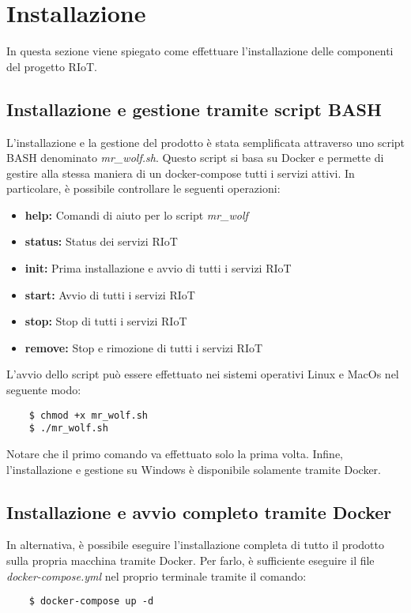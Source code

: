 \section{Installazione}
	In questa sezione viene spiegato come effettuare l'installazione delle componenti del progetto RIoT.

	\subsection{Installazione e gestione tramite script BASH}

	L'installazione e la gestione del prodotto è stata semplificata attraverso uno script BASH denominato \textit{mr\_wolf.sh}. Questo script si basa su Docker e permette di gestire alla stessa maniera di un docker-compose tutti i servizi attivi.
	In particolare, è possibile controllare le seguenti operazioni: 
	\begin{itemize}
		\item \textbf{help:}  	Comandi di aiuto per lo script \textit{mr\_wolf}
    	\item \textbf{status:}  Status dei servizi RIoT
    	\item \textbf{init:}  	Prima installazione e avvio di tutti i servizi RIoT
    	\item \textbf{start:} 	Avvio di tutti i servizi RIoT
    	\item \textbf{stop:}  	Stop di tutti i servizi RIoT
    	\item \textbf{remove:}	Stop e rimozione di tutti i servizi RIoT
	\end{itemize}

	L'avvio dello script può essere effettuato nei sistemi operativi Linux e MacOs nel seguente modo:
	\begin{verbatim}
	$ chmod +x mr_wolf.sh
	$ ./mr_wolf.sh
	\end{verbatim}
	Notare che il primo comando va effettuato solo la prima volta. Infine, l'installazione e gestione su Windows è disponibile solamente tramite Docker.

	\subsection{Installazione e avvio completo tramite Docker}
	
	In alternativa, è possibile eseguire l'installazione completa di tutto il prodotto sulla propria macchina tramite Docker. Per farlo, è sufficiente eseguire il file \textit{docker-compose.yml} nel proprio terminale tramite il comando:
	\begin{verbatim}
	$ docker-compose up -d
	\end{verbatim}


